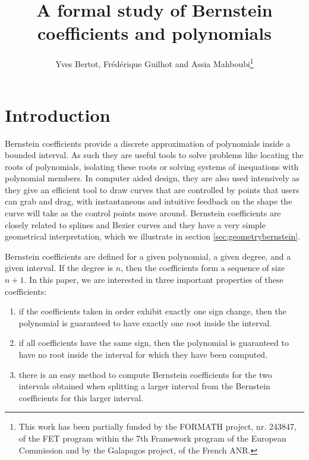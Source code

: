 \documentclass{mscs}
\begin{document}
\title{A formal study of Bernstein coefficients and polynomials}
\author[Y. Bertot, F. Guilhot and A. Mahboubi]{Yves Bertot,
  Fr\'ed\'erique Guilhot and Assia
  Mahboubi\thanks{This work has been partially funded by the FORMATH
    project, nr. 243847, of the FET program within the 7th Framework
    program of the European Commission and by the Galapagos project, of the
    French ANR.
}}

\maketitle

\section{Introduction}
Bernstein coefficients provide a discrete approximation of polynomials
inside a bounded interval. As such they are useful tools to solve
problems like locating the roots of polynomials, isolating these roots
or solving systems of inequations with polynomial members.  In
computer aided design, they are also used intensively as they give an
efficient tool to draw curves that are controlled by points that users
can grab and drag, with instantaneous and intuitive feedback on the
shape the curve will take as the control points move around.
Bernstein coefficients are closely related to splines and Bezier curves
and they have a very simple geometrical interpretation, which we illustrate
in section \ref{sec:geometrybernstein}.

Bernstein coefficients are defined for a given polynomial, a given
degree, and a given interval. If the degree is \(n\), then
the coefficients form a sequence of size \(n+1\). In
this paper, we are interested in three important properties of these
coefficients:
\begin{enumerate}
\item if the coefficients taken in order exhibit exactly one sign change,
  then the polynomial is guaranteed to have exactly one root inside
  the interval.
\item  if all coefficients have the same sign, then the
  polynomial is guaranteed to have no root inside the interval
  for which they have been computed.
\item there is an easy method to compute Bernstein coefficients for
  the two intervals obtained when splitting a larger interval from the
  Bernstein coefficients for this larger interval.
\end{enumerate}
\end{document}
